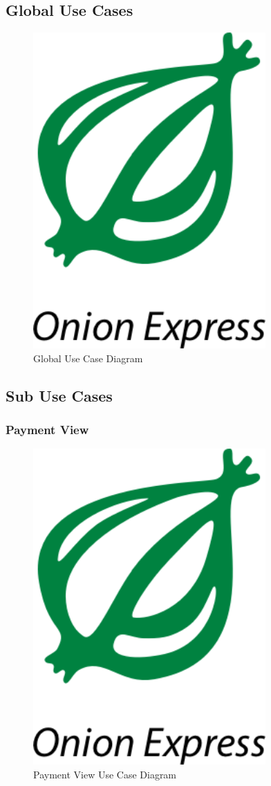 \documentclass[12pt]{scrreprt}
\begin{document}
\subsection{Global Use Cases}
\begin{figure}[htbp]
  \centering\includegraphics[width=3.5in]{DocumentRes/OnionExpress.png}
  \caption{Global Use Case Diagram}
\end{figure}
\subsection{Sub Use Cases}
\subsubsection{Payment View}
\begin{figure}[htbp]
  \centering\includegraphics[width=3.5in]{DocumentRes/OnionExpress.png}
  \caption{Payment View Use Case Diagram}
\end{figure}
\end{document}
